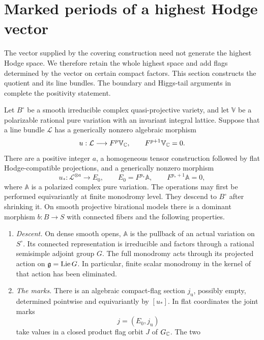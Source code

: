 \section{Marked periods of a highest Hodge vector}
\label{sec:marked-periods}

The vector supplied by the covering construction need not generate the
highest Hodge space.  We therefore retain the whole highest space and add
flags determined by the vector on certain compact factors.  This section
constructs the quotient and its line bundles.  The boundary and Higgs-tail
arguments in  complete the positivity statement.

\begin{proposition}\label{prop:marked-period}
Let $B^\circ$ be a smooth irreducible complex quasi-projective variety,
and let $\mathbb V$ be a polarizable rational pure variation with an
invariant integral lattice.  Suppose that a line bundle $\mathcal L$ has
a generically nonzero algebraic morphism
\[
 u:\mathcal L\longrightarrow F^p\mathbb V_{\mathbb C},
 \qquad F^{p+1}\mathbb V_{\mathbb C}=0.
\]
There are a positive integer $a$, a homogeneous tensor construction
followed by flat Hodge-compatible projections, and a generically nonzero
morphism
\begin{equation}\label{eq:marked-vector}
 u_*:\mathcal L^{\otimes a}\longrightarrow E_0,
 \qquad E_0=F^{p_*}\mathbb A,
 \qquad F^{p_*+1}\mathbb A=0,
\end{equation}
where $\mathbb A$ is a polarized complex pure variation.  The operations
may first be performed equivariantly at finite monodromy level.  They
descend to $B^\circ$ after shrinking it.  On smooth projective
birational models there is a dominant morphism
$b:B\to S$ with connected fibers and the following properties.
\begin{enumerate}
\item \emph{Descent.} On dense smooth opens, $\mathbb A$ is the pullback of an actual
variation on $S^\circ$.  Its connected representation is irreducible
and factors through a rational semisimple adjoint group $G$.  The full
monodromy acts through its projected action on
$\mathfrak g=\operatorname{Lie} G$.  In particular, finite scalar monodromy in the
kernel of that action has been eliminated.
\item \emph{The marks.} There is an algebraic compact-flag section $j_{\mathrm u}$,
possibly empty, determined pointwise and equivariantly by $[u_*]$.
In flat coordinates the joint marks
\[
 j=(E_0,j_{\mathrm u})
\]
take values in a closed product flag orbit $J$ of $G_{\mathbb C}$.  The two

\end{enumerate}
\end{proposition}
